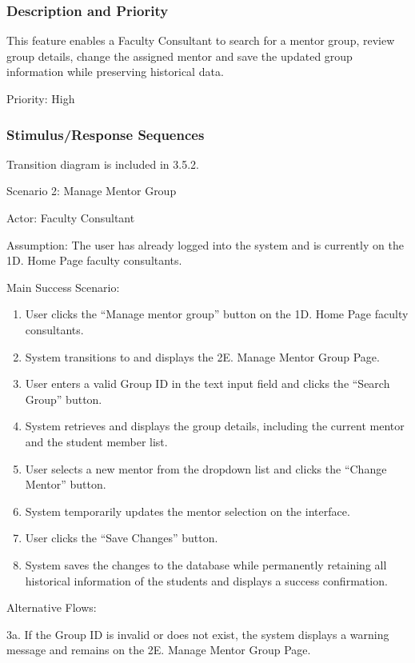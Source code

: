 \subsubsection{Description and Priority}

This feature enables a Faculty Consultant to search for a mentor group, review group details, change the assigned mentor and save the updated group information while preserving historical data.

Priority: High

\subsubsection{Stimulus/Response Sequences}

Transition diagram is included in 3.5.2.

Scenario 2: Manage Mentor Group

Actor: Faculty Consultant

Assumption: The user has already logged into the system and is currently on the 1D. Home Page faculty consultants.

Main Success Scenario:
\begin{enumerate}
\item User clicks the ``Manage mentor group'' button on the 1D. Home Page faculty consultants.
\item System transitions to and displays the 2E. Manage Mentor Group Page.
\item User enters a valid Group ID in the text input field and clicks the ``Search Group'' button.
\item System retrieves and displays the group details, including the current mentor and the student member list.
\item User selects a new mentor from the dropdown list and clicks the ``Change Mentor'' button.
\item System temporarily updates the mentor selection on the interface.
\item User clicks the ``Save Changes'' button.
\item System saves the changes to the database while permanently retaining all historical information of the students and displays a success confirmation.
\end{enumerate}

Alternative Flows:

3a. If the Group ID is invalid or does not exist, the system displays a warning message and remains on the 2E. Manage Mentor Group Page.

